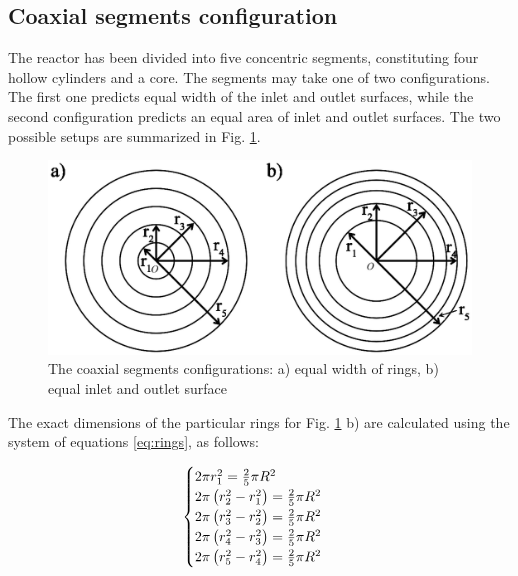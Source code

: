 \documentclass[preprint,12pt]{elsarticle}
\begin{document}
\subsection{Coaxial segments configuration}

The reactor has been divided into five concentric segments, constituting four hollow cylinders and a core. The segments may take one of two configurations. The first one predicts equal width of the inlet and outlet surfaces, while the second configuration predicts an equal area of inlet and outlet surfaces. The two possible setups are summarized in Fig. \ref{fig:inlet_rings}.  

\begin{figure}[h]
\centering
\includegraphics[width=120mm]{reactor_inlet_surface.eps}\hspace{2pc} 
\caption{\label{fig:inlet_rings} The coaxial segments configurations: a) equal width of rings, b) equal inlet and outlet surface}
\end{figure}

The exact dimensions of the particular rings for Fig. \ref{fig:inlet_rings} b) are calculated using the system of equations \eqref{eq:rings}, as follows:

\begin{equation}
\centering
\label{eq:rings}
\begin{cases}
	2\pi r_1^2 = \frac{2}{5}\pi R^2 \\
	2\pi \left(r_2^2 - r_1^2 \right) = \frac{2}{5}\pi R^2 \\
	2\pi \left(r_3^2 - r_2^2 \right) = \frac{2}{5}\pi R^2 \\
	2\pi \left(r_4^2 - r_3^2 \right) = \frac{2}{5}\pi R^2 \\
	2\pi \left(r_5^2 - r_4^2 \right) = \frac{2}{5}\pi R^2	
\end{cases}
\end{equation}

\vspace{3mm}
\end{document}
